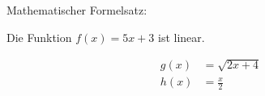 \documentclass{article}
\begin{document}
Mathematischer Formelsatz:

Die Funktion $f(x) = 5x+3$ ist linear.

\begin{subequations}
\begin{align}
g(x) &= \sqrt{2x+4} \\
h(x) &= \frac{x}{2}
\end{align}
\end{subequations}
\end{document}
